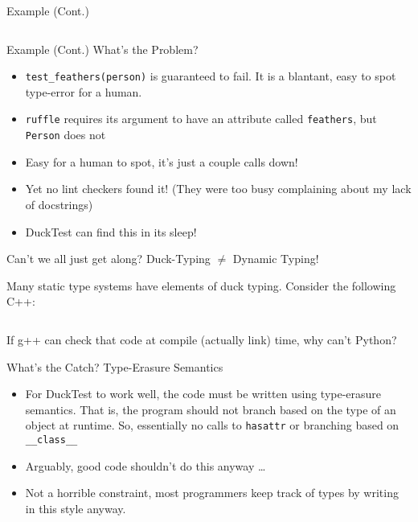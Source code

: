 \documentclass[12pt,t]{beamer}
\newcommand{\bi}{\begin{itemize}}
\newcommand{\ei}{\end{itemize}}
\newcommand{\subt}[1]{{\footnotesize \color{subtitle} {#1}}}
\newcommand{\codepy}{\texttt}
\newcommand{\vitem}{\vfill\item}
\newcommand{\filler}[1]{%
        \begin{frame}
            \vfill
            \centering{\color{title}\large#1}
        \end{frame}
    }
\begin{document}
\begin{frame}{Example (Cont.)}
    \small\inputminted{python}{code/body.py}
\end{frame}

\begin{frame}{Example (Cont.)}
    \subt{What's the Problem?}
    \begin{itemize}
        \vfill\item \codepy{test_feathers(person)} is guaranteed to fail. It
            is a blantant, easy to spot type-error for a human.
        \vfill\item \codepy{ruffle} requires its argument to have an attribute
            called \codepy{feathers}, but \codepy{Person} does not
        \vfill\item Easy for a human to spot, it's just a couple calls down!
        \vfill\item Yet no lint checkers found it! (They were too busy complaining
            about my lack of docstrings)
        \vfill\item DuckTest can find this in its sleep!
    \end{itemize}
\end{frame}

\begin{frame}{Can't we all just get along?}
    \subt{Duck-Typing $\not=$ Dynamic Typing!}

    Many static type systems have elements of duck typing. Consider
    the following C++:

    \vfill
    \inputminted{cpp}{code/cpp.cpp}
    \vfill

    If g++ can check that code at compile (actually link) time, why
    can't Python?
\end{frame}

\begin{frame}{What's the Catch?}
    \subt{Type-Erasure Semantics}
    \bi
    \vitem For DuckTest to work well, the code must be written using type-erasure
    semantics. That is, the program should not branch based on the type of
    an object at runtime. So, essentially no calls to \codepy{hasattr} or
    branching based on \codepy{__class__}
    \vitem Arguably, good code shouldn't do this anyway \ldots
    \vitem Not a horrible constraint, most programmers keep track of types by
    writing in this style anyway.
    \ei
\end{frame}

\filler{Implementation}
\end{document}
